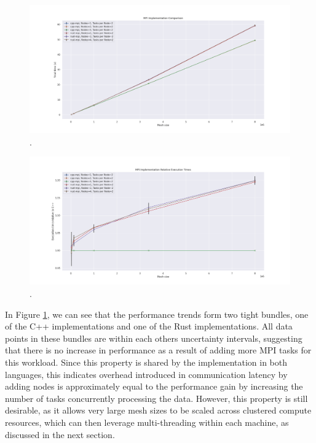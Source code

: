 \begin{figure}[H]
    \centering
    \includegraphics[width=\textwidth]{images/5_performance/parallelism/9_mpi_line.png}
    \caption{.}
    \label{fig:9_mpi_line}
\end{figure}

\begin{figure}[H]
    \centering
    \includegraphics[width=\textwidth]{images/5_performance/parallelism/10_mpi_line_relative.png}
    \caption{.}
    \label{fig:10_mpi_line_relative}
\end{figure}

In Figure \ref{fig:9_mpi_line}, we can see that the performance trends form two tight bundles, one of the C++ implementations and one of the Rust implementations. All data points in these bundles are within each others uncertainty intervals, suggesting that there is no increase in performance as a result of adding more MPI tasks for this workload. Since this property is shared by the implementation in both languages, this indicates overhead introduced in communication latency by adding nodes is approximately equal to the performance gain by increasing the number of tasks concurrently processing the data. However, this property is still desirable, as it allows very large mesh sizes to be scaled across clustered compute resources, which can then leverage multi-threading within each machine, as discussed in the next section.

